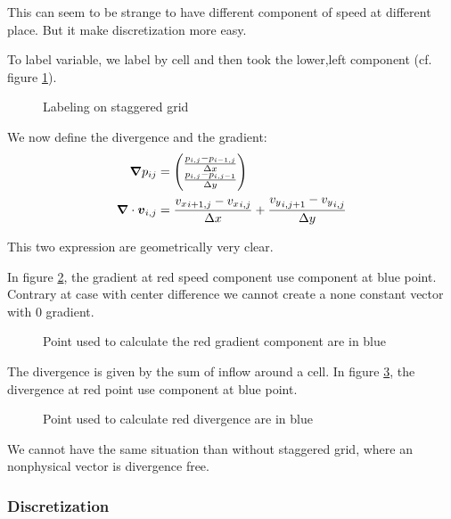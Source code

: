 This can seem to be strange to have different component of speed at different place. But it make discretization more easy.

To label variable, we label by cell and then took the lower,left component (cf. figure \ref{fixed:staggered_label}).

\begin{figure}
\caption{Labeling on staggered grid}
\label{fixed:staggered_label}
\end{figure}

We now define the divergence and the gradient:
\begin{align}
  {\boldsymbol {\nabla}}p_{ij}&=\begin{pmatrix}
    \frac{p_{i,j}-p_{i-1,j}}{\Delta x}\\
    \frac{p_{i,j}-p_{i,j-1}}{\Delta y}\\
                      \end{pmatrix}\\
  {\boldsymbol {\nabla}}\cdot {\boldsymbol {v}}_{i,j}&=\frac{{v_{x}}_{i+1,j}-{v_{x}}_{i,j}}{\Delta x}+\frac{{v_{y}}_{i,j+1}-{v_{y}}_{i,j}}{\Delta y}
\end{align}

This two expression are geometrically very clear.

In figure \ref{fixed:staggered_gradient}, the gradient at red speed component use component at blue point.
Contrary at case with center difference we cannot create a none constant vector with 0 gradient.

\begin{figure}
\caption{Point used to calculate the red gradient component are in blue}
\label{fixed:staggered_gradient}
\end{figure}

The divergence is given by the sum of inflow around a cell.
In figure \ref{fixed:staggered_divergence}, the divergence at red point use component at blue point.

\begin{figure}
\caption{Point used to calculate red divergence are in blue}
\label{fixed:staggered_divergence}
\end{figure}

We cannot have the same situation than without staggered grid, where an nonphysical vector is divergence free.

\subsubsection{Discretization}

